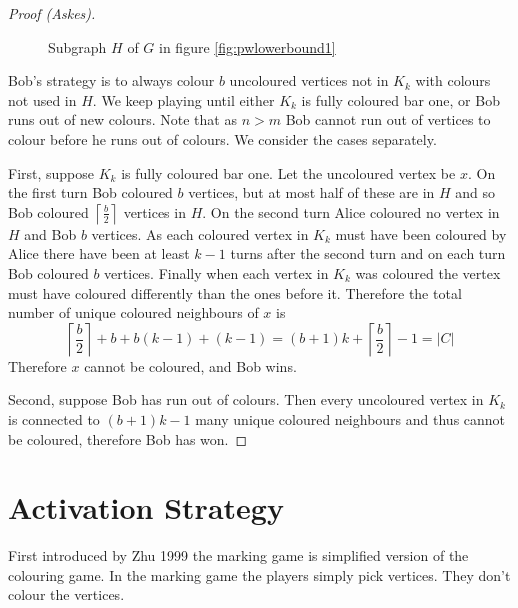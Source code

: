 \begin{proof}[Proof (Askes)]
\begin{figure}[H]
    \caption{Subgraph $H$ of $G$ in figure \ref{fig:pwlowerbound1}}
    \label{fig:pwlowerbound2}
\end{figure}


Bob's strategy is to always colour $b$ uncoloured vertices not in $K_k$ with colours not used in $H$. We keep playing until either $K_k$ is fully coloured bar one, or Bob runs out of new colours. Note that as $n>m$ Bob cannot run out of vertices to colour before he runs out of colours. We consider the cases separately. 

First, suppose $K_k$ is fully coloured bar one. Let the uncoloured vertex be $x$. On the first turn Bob coloured $b$ vertices, but at most half of these are in $H$ and so Bob coloured $\left\lceil \frac{b}{2}\right\rceil$ vertices in $H$. On the second turn Alice coloured no vertex in $H$ and Bob $b$ vertices. As each coloured vertex in $K_k$ must have been coloured by Alice there have been at least $k-1$ turns after the second turn and on each turn Bob coloured $b$ vertices. Finally when each vertex in $K_k$ was coloured the vertex must have coloured differently than the ones before it. Therefore the total number of unique coloured neighbours of $x$ is 
%
\[\left\lceil \frac{b}{2}\right\rceil+b +b(k-1)+(k-1)=(b+1)k+\left\lceil \frac{b}{2}\right\rceil-1 = |C|\]
%
Therefore $x$ cannot be coloured, and Bob wins.

Second, suppose Bob has run out of colours. Then every uncoloured vertex in $K_k$ is connected to $(b+1)k-1$ many unique coloured neighbours and thus cannot be coloured, therefore Bob has won.
\end{proof}

\section{Activation Strategy}

First introduced by  Zhu 1999 \cite{Zhu1999} the marking game is simplified version of the colouring game. In the marking game the players simply pick vertices. They don't colour the vertices. 

